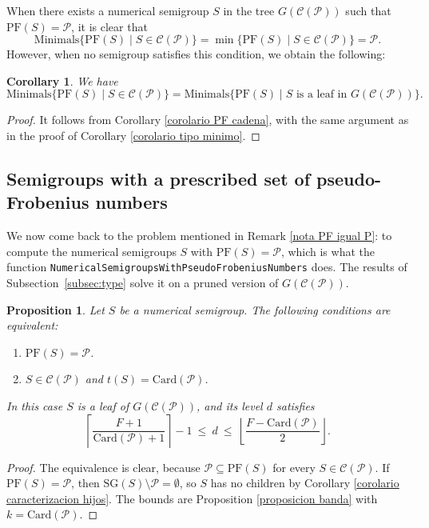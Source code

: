 \documentclass[11pt]{article}
\newtheorem{proposition}[theorem]{Proposition}
\newtheorem{corollary}[theorem]{Corollary}
\numberwithin{equation}{section}
\newcommand{\CP}{\mathcal C(\mathcal P)}
\newcommand{\PF}{\mathrm{PF}}
\newcommand{\SG}{\mathrm{SG}}
\newcommand{\NSPF}{\texttt{Numerical\-Semigroups\-With\-Pseudo\-Frobenius\-Numbers}}
\begin{document}
When there exists a numerical semigroup $S$ in the tree $G(\mathcal{C}(\mathcal{P}))$ such that $\mathrm{PF}(S)=\mathcal{P}$, it is clear that
\[
\mathrm{Minimals}\{\mathrm{PF}(S)\mid S\in\mathcal{C}(\mathcal{P})\}
=
\min\{\mathrm{PF}(S)\mid S\in\mathcal{C}(\mathcal{P})\}
=
\mathcal{P}.
\]
However, when no semigroup satisfies this condition, we obtain the following:

\begin{corollary}
    We have
$$\mathrm{Minimals}\{\mathrm{PF}(S)\mid S\in\mathcal C(\mathcal P)\}=\mathrm{Minimals}\{\mathrm{PF}(S) \mid S \text{ is a leaf in } G(\mathcal C(\mathcal P))\}.$$
\end{corollary}

\begin{proof}
It follows from Corollary \ref{corolario PF cadena}, with the same argument as in the proof of Corollary \ref{corolario tipo minimo}.
\end{proof}

\subsection{Semigroups with a prescribed set of pseudo-Frobenius numbers}\label{subsec:PF}

We now come back to the problem mentioned in Remark \ref{nota PF igual P}: to compute the numerical semigroups $S$ with $\PF(S)=\mathcal P$, which is what the function \NSPF{} does. The results of Subsection~\ref{subsec:type} solve it on a pruned version of $G(\CP)$.

\begin{proposition}\label{proposicion PF igual P}
Let $S$ be a numerical semigroup. The following conditions are equivalent:
\begin{enumerate}
\item $\PF(S)=\mathcal P$.
\item $S\in\CP$ and $t(S)=\mathrm{Card}(\mathcal P)$.
\end{enumerate}
In this case $S$ is a leaf of $G(\CP)$, and its level $d$ satisfies
\[
\left\lceil\frac{F+1}{\mathrm{Card}(\mathcal P)+1}\right\rceil-1\ \leq\ d\ \leq\ \left\lfloor\frac{F-\mathrm{Card}(\mathcal P)}{2}\right\rfloor .
\]
\end{proposition}

\begin{proof}
The equivalence is clear, because $\mathcal P\subseteq \PF(S)$ for every $S\in\CP$. If $\PF(S)=\mathcal P$, then $\SG(S)\setminus\mathcal P=\emptyset$, so $S$ has no children by Corollary \ref{corolario caracterizacion hijos}. The bounds are Proposition \ref{proposicion banda} with $k=\mathrm{Card}(\mathcal P)$.
\end{proof}
\end{document}
